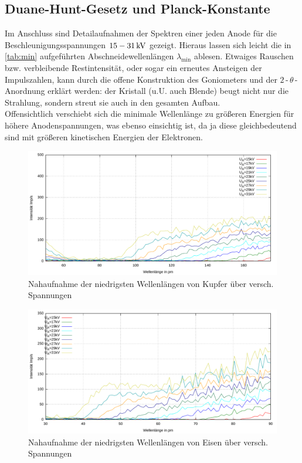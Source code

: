 \documentclass[numbers=noenddot,12pt,a4paper]{scrartcl}
\newcommand{\ix}[1]{_\text{#1}}
\begin{document}
\subsection{Duane-Hunt-Gesetz und Planck-Konstante}
Im Anschluss sind Detailaufnahmen der Spektren einer jeden Anode für die Beschleunigungsspannungen $\unit[15-31]{kV}$ gezeigt. Hieraus lassen sich leicht die in \ref{tab:min} aufgeführten Abschneidewellenlängen $\lambda\ix{min}$ ablesen. Etwaiges Rauschen bzw. verbleibende Restintensität, oder sogar ein erneutes Ansteigen der Impulszahlen, kann durch die offene Konstruktion des Goniometers und der $2$\,-\,$\theta$\,-\,Anordnung erklärt werden: der Kristall (u.U. auch Blende) beugt nicht nur die Strahlung, sondern streut sie auch in den gesamten Aufbau.\\
Offensichtlich verschiebt sich die minimale Wellenlänge zu größeren Energien für höhere Anodenspannungen, was ebenso einsichtig ist, da ja diese gleichbedeutend sind mit größeren kinetischen Energien der Elektronen.
\begin{figure}[H]
	\centering
	\includegraphics[width=\textwidth]{kupfermin.pdf}
	\caption{Nahaufnahme der niedrigsten Wellenlängen von Kupfer über versch. Spannungen} \label{img:cumin}
\end{figure}
\begin{figure}[H]
	\centering
	\includegraphics[width=\textwidth]{eisenmin.pdf}
	\caption{Nahaufnahme der niedrigsten Wellenlängen von Eisen über versch. Spannungen} \label{img:femin}
\end{figure}
	
\end{document}

